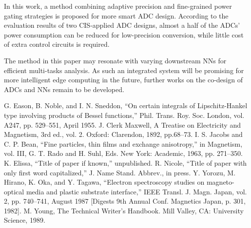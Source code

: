 \documentclass[conference]{IEEEtran}
\begin{document}
In this work, a method combining adaptive precision and fine-grained power gating strategies is proposed for more smart ADC design. 
According to the evaluation results of two CIS-applied ADC designs, almost a half of the ADCs’ power consumption can be reduced for low-precision conversion, 
while little cost of extra control circuits is required.

The method in this paper may resonate with varying downstream NNs for efficient multi-tasks analysis. 
As such an integrated system will be promising for more intelligent edge computing in the future, further works on the co-design of ADCs and NNs remain to be developed.

\begin{thebibliography}{00}
 G. Eason, B. Noble, and I. N. Sneddon, ``On certain integrals of Lipschitz-Hankel type involving products of Bessel functions,'' Phil. Trans. Roy. Soc. London, vol. A247, pp. 529--551, April 1955.
 J. Clerk Maxwell, A Treatise on Electricity and Magnetism, 3rd ed., vol. 2. Oxford: Clarendon, 1892, pp.68--73.
 I. S. Jacobs and C. P. Bean, ``Fine particles, thin films and exchange anisotropy,'' in Magnetism, vol. III, G. T. Rado and H. Suhl, Eds. New York: Academic, 1963, pp. 271--350.
 K. Elissa, ``Title of paper if known,'' unpublished.
 R. Nicole, ``Title of paper with only first word capitalized,'' J. Name Stand. Abbrev., in press.
 Y. Yorozu, M. Hirano, K. Oka, and Y. Tagawa, ``Electron spectroscopy studies on magneto-optical media and plastic substrate interface,'' IEEE Transl. J. Magn. Japan, vol. 2, pp. 740--741, August 1987 [Digests 9th Annual Conf. Magnetics Japan, p. 301, 1982].
 M. Young, The Technical Writer's Handbook. Mill Valley, CA: University Science, 1989.
\end{thebibliography}
\end{document}
